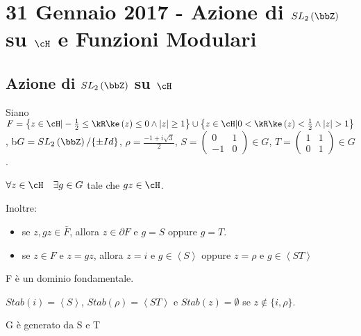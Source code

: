 \chapter{31 Gennaio 2017 - Azione di $SL_2 \left( \bbZ \right)$ su $\cH$ e Funzioni Modulari}
\justify

\section{Azione di $SL_2 \left( \bbZ \right)$ su $\cH$}

Siano $F=\left\{z \in \cH | -\frac{1}{2} \leq \Re(z) \leq 0
\wedge |z| \geq 1 \right\} \cup
\left\{z \in \cH | 0 < \Re(z) < \frac{1}{2} \wedge |z| > 1 \right\}$,
b$G=SL_2 \left( \bbZ \right)/\{\pm Id\}$,   $\rho=\frac{-1+i\sqrt{3}}{2}$,
$S=\left( \begin{array}{cc} 0 & 1 \\ -1 & 0 \end{array} \right) \in G$,
$T=\left( \begin{array}{cc} 1 & 1 \\ 0 & 1 \end{array} \right) \in G$.

\begin{teorema}[1]
$\forall z \in \cH \quad \exists g \in G$ tale che $gz \in \cH$.

Inoltre:
\begin{itemize}
	\item se $z,gz \in \bar{F}$, allora $z \in \partial F$ e $g=S$ oppure $g=T$.
	\item se $z \in F$ e $z=gz$,
				allora $z=i$ e $g \in \left\langle S \right\rangle$ oppure
				$z= \rho$ e $g \in \left\langle ST \right\rangle$
\end{itemize}
\end{teorema}

\begin{corollario}
F è un dominio fondamentale.

$Stab(i)=\left\langle S \right\rangle$, 
$Stab(\rho)=\left\langle ST \right\rangle$ e $Stab(z)=\emptyset$ se 
$z \notin \{i, \rho \}$.
\end{corollario}

\begin{teorema}
G è generato da S e T
\end{teorema}


